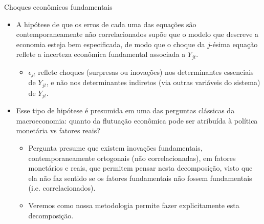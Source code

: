 \documentclass[11pt]{beamer}
\begin{document}
\begin{frame}{Choques econômicos fundamentais }
	\begin{itemize}
		\item A hipótese de que os erros de cada uma das equações são contemporaneamente não correlacionados supõe que o modelo que descreve a economia esteja {\color{blue}bem especificada}, de modo que o choque da $j$-ésima equação reflete a incerteza econômica fundamental associada a $Y_{jt}$.
		\begin{itemize}
			\item $\epsilon_{jt}$ reflete choques (surpresas ou inovações) nos determinantes essenciais de $Y_{jt}$, e não nos determinantes indiretos (via outras variáveis do sistema) de $Y_{jt}$. 
	
		\end{itemize}
				\item Esse tipo de hipótese é presumida em uma das perguntas clássicas da macroeconomia: quanto da flutuação econômica pode ser atribuída à política monetária vs fatores reais?
				\begin{itemize}
					\item Pergunta presume que existem inovações fundamentais, contemporaneamente ortogonais (não correlacionadas), em fatores monetários e reais, que permitem pensar nesta decomposição, visto que ela não faz sentido se os fatores fundamentais não fossem fundamentais (i.e. correlacionados).
					\item Veremos como nossa metodologia permite fazer explicitamente esta decomposição.
				\end{itemize}
	
	\end{itemize}
\end{frame}
\end{document}
